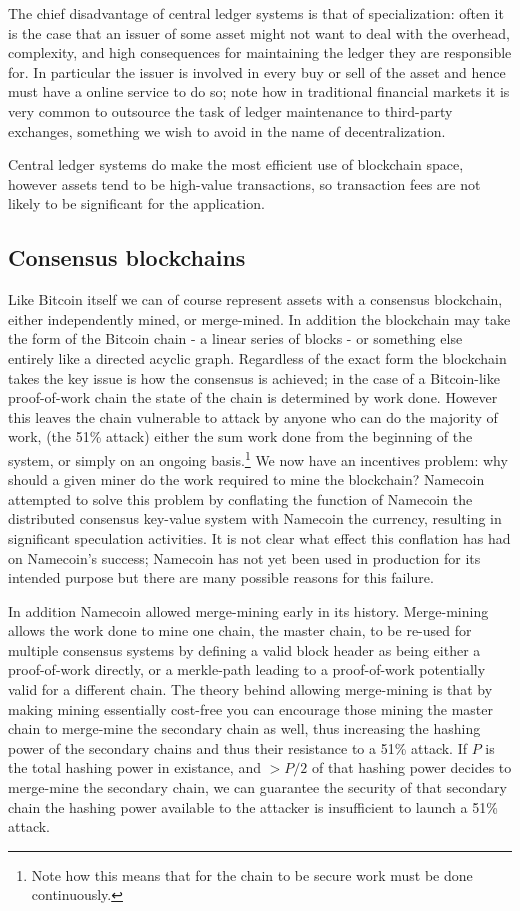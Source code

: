 \documentclass{article}
\begin{document}
The chief disadvantage of central ledger systems is that of specialization:
often it is the case that an issuer of some asset might not want to deal with
the overhead, complexity, and high consequences for maintaining the ledger they
are responsible for. In particular the issuer is involved in every buy or sell
of the asset and hence must have a online service to do so; note how in
traditional financial markets it is very common to outsource the task of ledger
maintenance to third-party exchanges, something we wish to avoid in the name of
decentralization.

Central ledger systems do make the most efficient use of blockchain space,
however assets tend to be high-value transactions, so transaction fees are not
likely to be significant for the application.


\subsection{Consensus blockchains}

Like Bitcoin itself we can of course represent assets with a consensus
blockchain, either independently mined, or merge-mined. In addition the
blockchain may take the form of the Bitcoin chain - a linear series of blocks -
or something else entirely like a directed acyclic graph. Regardless of the
exact form the blockchain takes the key issue is how the consensus is achieved;
in the case of a Bitcoin-like proof-of-work chain the state of the chain is
determined by work done. However this leaves the chain vulnerable to attack by
anyone who can do the majority of work, (the 51\% attack) either the sum work
done from the beginning of the system, or simply on an ongoing
basis.\footnote{Note how this means that for the chain to be secure work must
be done continuously.} We now have an incentives problem: why should a given
miner do the work required to mine the blockchain? Namecoin attempted to solve
this problem by conflating the function of Namecoin the distributed consensus
key-value system with Namecoin the currency, resulting in significant
speculation activities. It is not clear what effect this conflation has had on
Namecoin's success; Namecoin has not yet been used in production for its
intended purpose but there are many possible reasons for this failure.

In addition Namecoin allowed merge-mining early in its history. Merge-mining
allows the work done to mine one chain, the master chain, to be re-used for
multiple consensus systems by defining a valid block header as being either a
proof-of-work directly, or a merkle-path leading to a proof-of-work potentially
valid for a different chain. The theory behind allowing merge-mining is that by
making mining essentially cost-free you can encourage those mining the master
chain to merge-mine the secondary chain as well, thus increasing the hashing
power of the secondary chains and thus their resistance to a 51\% attack. If
$P$ is the total hashing power in existance, and $>P/2$ of that hashing power
decides to merge-mine the secondary chain, we can guarantee the security of
that secondary chain the hashing power available to the attacker is
insufficient to launch a 51\% attack.
\end{document}
